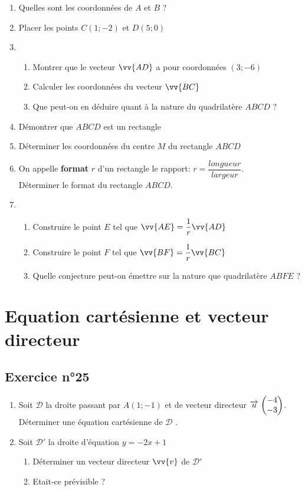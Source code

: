 \documentclass[12pt,a4paper]{article}
\begin{document}
\begin{enumerate}
    \item Quelles sont les coordonnées de $A$ et $B$ ?
    \item Placer les points $C(1;-2)$ et $D(5;0)$
    \item 
    \begin{enumerate}
        \item Montrer que le vecteur $\vv{AD}$ a pour coordonnées $(3;-6)$
        \item Calculer les coordonnées du vecteur $\vv{BC}$
        \item Que peut-on en déduire quant à la nature du quadrilatère $ABCD$ ?
    \end{enumerate}
    \item Démontrer que $ABCD$ est un rectangle
    \item Déterminer les coordonnées du centre $M$ du rectangle $ABCD$
    \item On appelle \textbf{format} $r$ d'un rectangle le rapport: $r=\dfrac{longueur}{largeur}$.\\ Déterminer le format du rectangle $ABCD$.
    \item 
    \begin{enumerate}
        \item Construire le point $E$ tel que $\vv{AE}=\dfrac{1}{r}\vv{AD}$
        \item Construire le point $F$ tel que $\vv{BF}=\dfrac{1}{r}\vv{BC}$
        \item Quelle conjecture peut-on émettre sur la nature que quadrilatère $ABFE$ ?
    \end{enumerate}
\end{enumerate}

\newpage
\section{Equation cartésienne et vecteur directeur}

\subsection*{Exercice n°25}

\begin{enumerate}
    \item Soit $\mathscr{D}$ la droite passant par $A(1;-1)$ et de vecteur directeur $\overrightarrow{u}\, \begin{pmatrix} -4\\ -3 \end{pmatrix}$.\\ Déterminer une équation cartésienne de $\mathscr{D}$ .
    \item Soit $\mathscr{D'}$ la droite d'équation $y=-2x+1$
    \begin{enumerate}
        \item Déterminer un vecteur directeur $\vv{v}$ de $\mathscr{D'}$
        \item Etait-ce prévisible ?
    \end{enumerate}
\end{enumerate}
\end{document}
